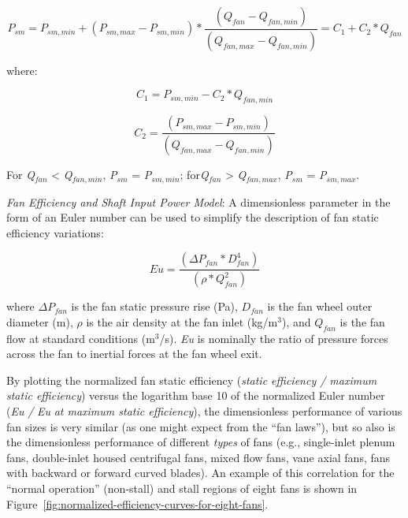 \begin{equation}
{P_{sm}} = {P_{sm,min }} + \left( {{P_{sm,max }} - {P_{sm,min }}} \right)*\frac{{\left( {{Q_{fan}} - {Q_{fan,min }}} \right)}}{{\left( {{Q_{fan,max }} - {Q_{fan,min }}} \right)}} = {C_1} + {C_2}*{Q_{fan}}
\label{eq:Psm533}
\end{equation}

where:

\begin{equation}
{C_1} = {P_{sm,min }} - {C_2}*{Q_{fan,min }}
\end{equation}

\begin{equation}
{C_2} = \frac{{\left( {{P_{sm,max }} - {P_{sm,min }}} \right)}}{{\left( {{Q_{fan,max }} - {Q_{fan,min }}} \right)}}
\end{equation}

For \emph{Q\(_{fan}\)} \textless{} \emph{Q\(_{fan,min}\)}, \emph{P\(_{sm}\)} = \emph{P\(_{sm,min}\)}; for\emph{Q\(_{fan}\)} \textgreater{} \emph{Q\(_{fan,max}\)}, \emph{P\(_{sm}\)} = \emph{P\(_{sm,max}\)}.

\emph{Fan Efficiency and Shaft Input Power Model}: A dimensionless parameter in the form of an Euler number can be used to simplify the description of fan static efficiency variations:

\begin{equation}
Eu = \frac{{\left( {\Delta {P_{fan}} * D_{fan}^4} \right)}}{{\left( {\rho * Q_{fan}^2} \right)}}
\label{eq:Eu535}
\end{equation}

where \(\Delta {P_{fan}}\) is the fan static pressure rise (Pa), \({D_{fan}}\) is the fan wheel outer diameter (m), \(\rho\) is the air density at the fan inlet (kg/m\(^{3}\)), and \({Q_{fan}}\) is the fan flow at standard conditions (m\(^{3}\)/s). \emph{Eu} is nominally the ratio of pressure forces across the fan to inertial forces at the fan wheel exit.

By plotting the normalized fan static efficiency (\emph{static efficiency / maximum static efficiency}) versus the logarithm base 10 of the normalized Euler number (\emph{Eu} \emph{/} \emph{Eu} \emph{at maximum static efficiency}), the dimensionless performance of various fan sizes is very similar (as one might expect from the ``fan laws''), but so also is the dimensionless performance of different \emph{types} of fans (e.g., single-inlet plenum fans, double-inlet housed centrifugal fans, mixed flow fans, vane axial fans, fans with backward or forward curved blades). An example of this correlation for the ``normal operation'' (non-stall) and stall regions of eight fans is shown in Figure~\ref{fig:normalized-efficiency-curves-for-eight-fans}.

